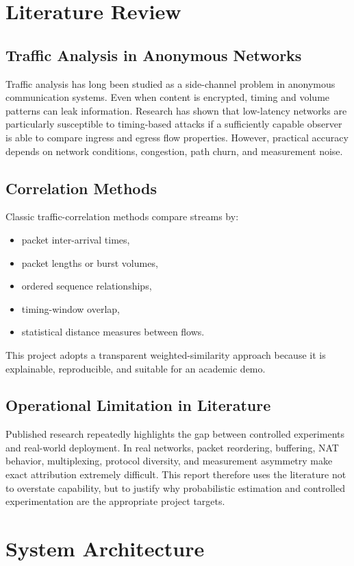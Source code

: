 \documentclass[12pt,a4paper]{report}
\begin{document}
\chapter{Literature Review}
\section{Traffic Analysis in Anonymous Networks}
Traffic analysis has long been studied as a side-channel problem in anonymous communication systems. Even when content is encrypted, timing and volume patterns can leak information. Research has shown that low-latency networks are particularly susceptible to timing-based attacks if a sufficiently capable observer is able to compare ingress and egress flow properties. However, practical accuracy depends on network conditions, congestion, path churn, and measurement noise.

\section{Correlation Methods}
Classic traffic-correlation methods compare streams by:
\begin{itemize}[leftmargin=1.5em]
    \item packet inter-arrival times,
    \item packet lengths or burst volumes,
    \item ordered sequence relationships,
    \item timing-window overlap,
    \item statistical distance measures between flows.
\end{itemize}
This project adopts a transparent weighted-similarity approach because it is explainable, reproducible, and suitable for an academic demo.

\section{Operational Limitation in Literature}
Published research repeatedly highlights the gap between controlled experiments and real-world deployment. In real networks, packet reordering, buffering, NAT behavior, multiplexing, protocol diversity, and measurement asymmetry make exact attribution extremely difficult. This report therefore uses the literature not to overstate capability, but to justify why probabilistic estimation and controlled experimentation are the appropriate project targets.

\chapter{System Architecture}
\end{document}
